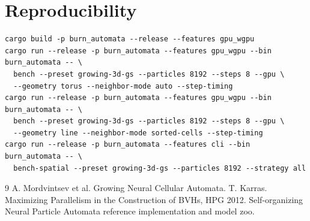 \documentclass[10pt,twocolumn]{article}
\begin{document}
\section{Reproducibility}
\begin{verbatim}
cargo build -p burn_automata --release --features gpu_wgpu
cargo run --release -p burn_automata --features gpu_wgpu --bin burn_automata -- \
  bench --preset growing-3d-gs --particles 8192 --steps 8 --gpu \
  --geometry torus --neighbor-mode auto --step-timing
cargo run --release -p burn_automata --features gpu_wgpu --bin burn_automata -- \
  bench --preset growing-3d-gs --particles 8192 --steps 8 --gpu \
  --geometry line --neighbor-mode sorted-cells --step-timing
cargo run --release -p burn_automata --features cli --bin burn_automata -- \
  bench-spatial --preset growing-3d-gs --particles 8192 --strategy all
\end{verbatim}

\begin{thebibliography}{9}
\bibitem{nca} A. Mordvintsev et al. Growing Neural Cellular Automata.
\bibitem{lbvh} T. Karras. Maximizing Parallelism in the Construction of BVHs, HPG 2012.
\bibitem{npa} Self-organizing Neural Particle Automata reference implementation and model zoo.
\end{thebibliography}
\end{document}
